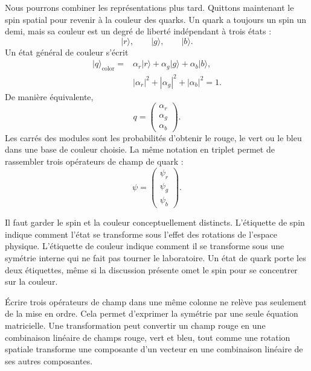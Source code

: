 Nous pourrons combiner les représentations plus tard. Quittons maintenant le spin spatial pour revenir à la couleur des quarks. Un quark a toujours un spin un demi, mais sa couleur est un degré de liberté indépendant à trois états :
\begin{equation}
\lvert r\rangle,\qquad
\lvert g\rangle,\qquad
\lvert b\rangle.
\end{equation}
Un état général de couleur s’écrit
\begin{equation}
\begin{aligned}
\lvert q\rangle_{\mathrm{color}}
={}&
\alpha_r\lvert r\rangle
+\alpha_g\lvert g\rangle
+\alpha_b\lvert b\rangle,
\\
&|\alpha_r|^2+|\alpha_g|^2+|\alpha_b|^2=1.
\end{aligned}
\end{equation}
De manière équivalente,
\begin{equation}
q=
\begin{pmatrix}
\alpha_r\\
\alpha_g\\
\alpha_b
\end{pmatrix}.
\end{equation}
Les carrés des modules sont les probabilités d’obtenir le rouge, le vert ou le bleu dans une base de couleur choisie. La même notation en triplet permet de rassembler trois opérateurs de champ de quark :
\begin{equation}
\psi=
\begin{pmatrix}
\psi_r\\
\psi_g\\
\psi_b
\end{pmatrix}.
\end{equation}

Il faut garder le spin et la couleur conceptuellement distincts. L’étiquette de spin indique comment l’état se transforme sous l’effet des rotations de l’espace physique. L’étiquette de couleur indique comment il se transforme sous une symétrie interne qui ne fait pas tourner le laboratoire. Un état de quark porte les deux étiquettes, même si la discussion présente omet le spin pour se concentrer sur la couleur.

Écrire trois opérateurs de champ dans une même colonne ne relève pas seulement de la mise en ordre. Cela permet d’exprimer la symétrie par une seule équation matricielle. Une transformation peut convertir un champ rouge en une combinaison linéaire de champs rouge, vert et bleu, tout comme une rotation spatiale transforme une composante d’un vecteur en une combinaison linéaire de ses autres composantes.

